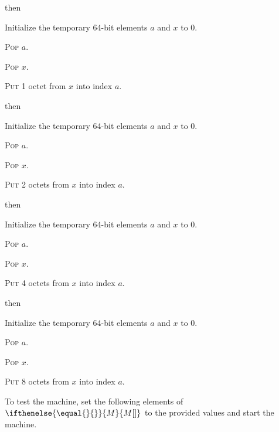 \documentclass[a4paper,12pt]{article}
\newcommand{\num}[1]{\texttt{#1}}
\newcommand{\hex}[1]{\num{#1}_{\textup{\tiny 16}}}
\newcommand{\MEM}[1]{\ifthenelse{\equal{#1}{}}{M}{M[#1]}}
\newcommand{\proc}[1]{\textsc{#1}}
\newcommand{\op}[1]{$#1$}
\newcommand{\STOREB}    [1]{\op{\hex{14}}}
\newcommand{\STORES}    [1]{\op{\hex{15}}}
\newcommand{\STOREI}    [1]{\op{\hex{16}}}
\newcommand{\STOREL}    [1]{\op{\hex{17}}}
\begin{document}
\begin{stepnumbers}[start=3]
\begin{description}
\begin{stepnumbers}
    \end{stepnumbers}
  \item[\STOREB{}] then
    \begin{stepnumbers}
    \item Initialize the temporary 64-bit elements $a$ and $x$ to 0.
    \item \proc{Pop} $a$.
    \item \proc{Pop} $x$.
    \item \proc{Put} 1 octet from $x$ into index $a$.
    \end{stepnumbers}
  \item[\STORES{}] then
    \begin{stepnumbers}
    \item Initialize the temporary 64-bit elements $a$ and $x$ to 0.
    \item \proc{Pop} $a$.
    \item \proc{Pop} $x$.
    \item \proc{Put} 2 octets from $x$ into index $a$.
    \end{stepnumbers}
  \item[\STOREI{}] then
    \begin{stepnumbers}
    \item Initialize the temporary 64-bit elements $a$ and $x$ to 0.
    \item \proc{Pop} $a$.
    \item \proc{Pop} $x$.
    \item \proc{Put} 4 octets from $x$ into index $a$.
    \end{stepnumbers}
  \item[\STOREL{}] then
    \begin{stepnumbers}
    \item Initialize the temporary 64-bit elements $a$ and $x$ to 0.
    \item \proc{Pop} $a$.
    \item \proc{Pop} $x$.
    \item \proc{Put} 8 octets from $x$ into index $a$.
    \end{stepnumbers}
  \end{description}
\end{stepnumbers}
To test the machine, set the following elements of $\MEM{}$ to the provided values and start the machine.
\end{document}
